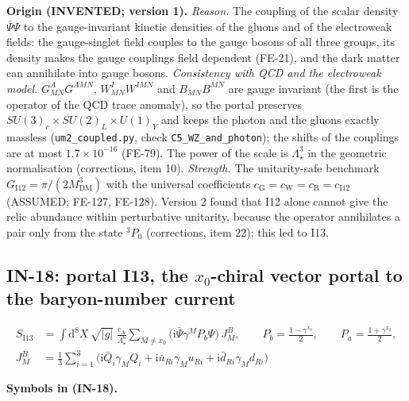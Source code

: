 \documentclass[
  10pt,
]{article}
\begin{document}
\textbf{Origin (INVENTED; version 1).} \emph{Reason.} The coupling of
the scalar density \(\bar\Psi\Psi\) to the gauge-invariant kinetic
densities of the gluons and of the electroweak fields: the gauge-singlet
field couples to the gauge bosons of all three groups, its density makes
the gauge couplings field dependent (FE-21), and the dark matter can
annihilate into gauge bosons. \emph{Consistency with QCD and the
electroweak model.} \(G^A_{MN}G^{AMN}\), \(W^I_{MN}W^{IMN}\) and
\(B_{MN}B^{MN}\) are gauge invariant (the first is the operator of the
QCD trace anomaly), so the portal preserves
\(SU(3)_c\times SU(2)_L\times U(1)_Y\) and keeps the photon and the
gluons exactly massless (\texttt{um2\_coupled.py}, check
\texttt{C5\_WZ\_and\_photon}); the shifts of the couplings are at most
\(1.7\times10^{-16}\) (FE-79). The power of the scale is
\(\Lambda_\star^3\) in the geometric normalisation (corrections, item
10). \emph{Strength.} The unitarity-safe benchmark
\(G_{\mathrm{I12}} = \pi/(2M_{\mathrm{DM}}^3)\) with the universal
coefficients
\(c_{\mathrm{G}} = c_{\mathrm{W}} = c_{\mathrm{B}} = c_{\mathrm{I12}}\)
(ASSUMED; FE-127, FE-128). Version 2 found that I12 alone cannot give
the relic abundance within perturbative unitarity, because the operator
annihilates a pair only from the state \(^3P_0\) (corrections, item 22);
this led to I13.

\hypertarget{in-18-portal-i13-the-x_0-chiral-vector-portal-to-the-baryon-number-current}{%
\subsection{\texorpdfstring{IN-18: portal I13, the \(x_0\)-chiral vector
portal to the baryon-number
current}{IN-18: portal I13, the x\_0-chiral vector portal to the baryon-number current}}\label{in-18-portal-i13-the-x_0-chiral-vector-portal-to-the-baryon-number-current}}

\[
\begin{aligned}
S_{\mathrm{I13}} &= \int\mathrm{d}^8X\,\sqrt{\lvert g\rvert}\;\frac{c_{\mathrm{A}}}{\Lambda_\star^6}
 \sum_{M\ne x_0}\big(\mathrm{i}\bar\Psi\gamma^MP_b\Psi\big)\,J^{B}_M,\qquad P_b = \frac{1 - \gamma^{x_0}}{2},
 \qquad P_a = \frac{1 + \gamma^{x_0}}{2},\\
J^{B}_M &= \frac13\sum_{i=1}^{3}\big(\mathrm{i}\bar Q_i\gamma_MQ_i + \mathrm{i}\bar u_{Ri}\gamma_Mu_{Ri}
 + \mathrm{i}\bar d_{Ri}\gamma_Md_{Ri}\big)
\end{aligned} \tag{IN-18}
\]

\textbf{Symbols in (IN-18).}
\end{document}
